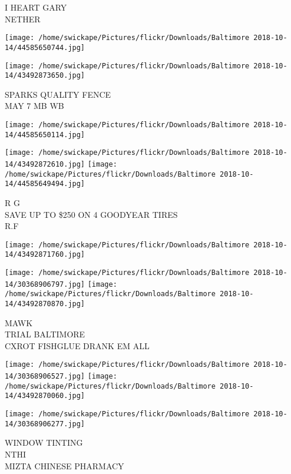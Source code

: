 \documentclass[10pt,letterpaper]{article}
\begin{document}
I HEART GARY\\
NETHER\\
\pagebreak

\texttt{[image: /home/swickape/Pictures/flickr/Downloads/Baltimore 2018-10-14/44585650744.jpg]}

\vspace{0.25in}
\texttt{[image: /home/swickape/Pictures/flickr/Downloads/Baltimore 2018-10-14/43492873650.jpg]}

SPARKS QUALITY FENCE\\
MAY 7 MB WB\\
\pagebreak

\texttt{[image: /home/swickape/Pictures/flickr/Downloads/Baltimore 2018-10-14/44585650114.jpg]}

\vspace{0.25in}
\texttt{[image: /home/swickape/Pictures/flickr/Downloads/Baltimore 2018-10-14/43492872610.jpg]}
\texttt{[image: /home/swickape/Pictures/flickr/Downloads/Baltimore 2018-10-14/44585649494.jpg]}

R G\\
SAVE UP TO \$250 ON 4 GOODYEAR TIRES\\
R.F\\
\pagebreak

\texttt{[image: /home/swickape/Pictures/flickr/Downloads/Baltimore 2018-10-14/43492871760.jpg]}

\vspace{0.25in}
\texttt{[image: /home/swickape/Pictures/flickr/Downloads/Baltimore 2018-10-14/30368906797.jpg]}
\texttt{[image: /home/swickape/Pictures/flickr/Downloads/Baltimore 2018-10-14/43492870870.jpg]}

MAWK\\
TRIAL BALTIMORE\\
CXROT FISHGLUE DRANK EM ALL\\
\pagebreak

\texttt{[image: /home/swickape/Pictures/flickr/Downloads/Baltimore 2018-10-14/30368906527.jpg]}
\texttt{[image: /home/swickape/Pictures/flickr/Downloads/Baltimore 2018-10-14/43492870060.jpg]}

\vspace{0.25in}
\texttt{[image: /home/swickape/Pictures/flickr/Downloads/Baltimore 2018-10-14/30368906277.jpg]}

WINDOW TINTING\\
NTHI\\
MIZTA CHINESE PHARMACY\\
\pagebreak
\end{document}
